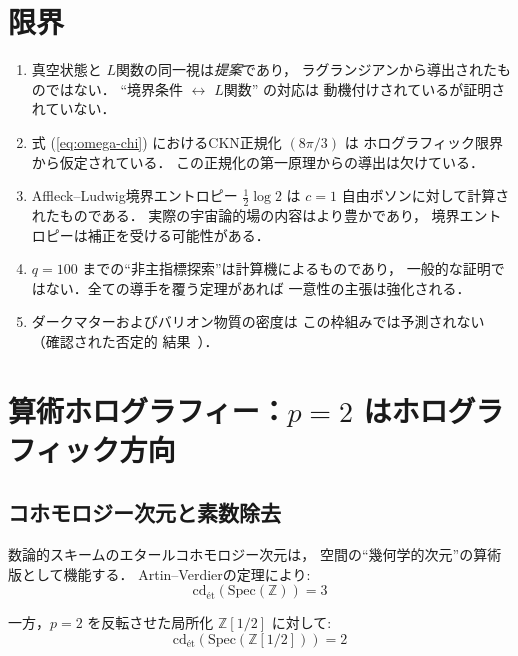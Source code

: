 \documentclass[11pt,a4paper]{article}
\begin{document}
\section{限界}

\begin{enumerate}
\item 真空状態と $L$関数の同一視は\emph{提案}であり，
ラグランジアンから導出されたものではない．
``境界条件 $\leftrightarrow$ $L$関数'' の対応は
動機付けされているが証明されていない．

\item 式 (\ref{eq:omega-chi}) におけるCKN正規化 $(8\pi/3)$ は
ホログラフィック限界から仮定されている．
この正規化の第一原理からの導出は欠けている．

\item Affleck--Ludwig境界エントロピー $\frac{1}{2}\log 2$ は
$c = 1$ 自由ボソンに対して計算されたものである．
実際の宇宙論的場の内容はより豊かであり，
境界エントロピーは補正を受ける可能性がある．

\item $q = 100$ までの``非主指標探索''は計算機によるものであり，
一般的な証明ではない．全ての導手を覆う定理があれば
一意性の主張は強化される．

\item ダークマターおよびバリオン物質の密度は
この枠組みでは予測されない（確認された否定的
結果~\cite{wb-euler-sectors}）．
\end{enumerate}

\section{算術ホログラフィー：$p = 2$ はホログラフィック方向}

\subsection{コホモロジー次元と素数除去}

数論的スキームのエタールコホモロジー次元は，
空間の``幾何学的次元''の算術版として機能する．
Artin--Verdierの定理により:
\begin{equation}
\mathrm{cd}_{\text{\'et}}(\mathrm{Spec}(\mathbb{Z})) = 3
\end{equation}

一方，$p = 2$ を反転させた局所化 $\mathbb{Z}[1/2]$ に対して:
\begin{equation}
\mathrm{cd}_{\text{\'et}}(\mathrm{Spec}(\mathbb{Z}[1/2])) = 2
\end{equation}
\end{document}
